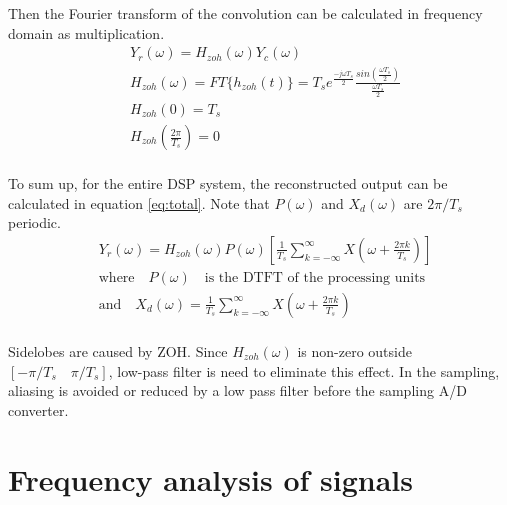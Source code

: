Then the Fourier transform of the convolution can be calculated in frequency 
domain as multiplication.
\begin{equation}
  \label{eq:zohconv}
  \begin{aligned}
   &  Y_r(\omega)  = H_{zoh}(\omega)Y_c(\omega) \\
   & H_{zoh}(\omega) = FT\{h_{zoh}(t)\}=T_s e^{\frac{-j\omega T_s}{2}}\frac{sin(\frac{\omega T_s}{2})}{\frac{\omega T_s}{2}}\\
   & H_{zoh}(0)  = T_s \\
   & H_{zoh}(\frac{2\pi}{T_s})  = 0 \\
  \end{aligned}
\end{equation}

To sum up, for the entire DSP system, the reconstructed output can be calculated in equation \ref{eq:total}.
Note that $P(\omega)$ and $X_d(\omega)$ are $2\pi/T_s$ periodic. 
\begin{equation}
  \label{eq:total}
  \begin{aligned}
    & Y_r(\omega)  = H_{zoh}(\omega)P(\omega)[\frac{1}{T_s}\sum_{k=-\infty}^{\infty}X(\omega+\frac{2\pi k}{T_s})] \\
    & \text{where}\quad P(\omega) \quad \text{is the DTFT of the processing units} \\
    & \text{and} \quad X_d(\omega) = \frac{1}{T_s}\sum_{k=-\infty}^{\infty}X(\omega+\frac{2\pi k}{T_s})\\
  \end{aligned}
\end{equation}

Sidelobes are caused by ZOH. Since $H_{zoh}(\omega)$ is non-zero outside $[-\pi/T_s \quad \pi/T_s]$, 
low-pass filter is need to eliminate this effect. In the sampling, aliasing is avoided or reduced by 
a low pass filter before the sampling A/D converter. 

\section*{Frequency analysis of signals}

